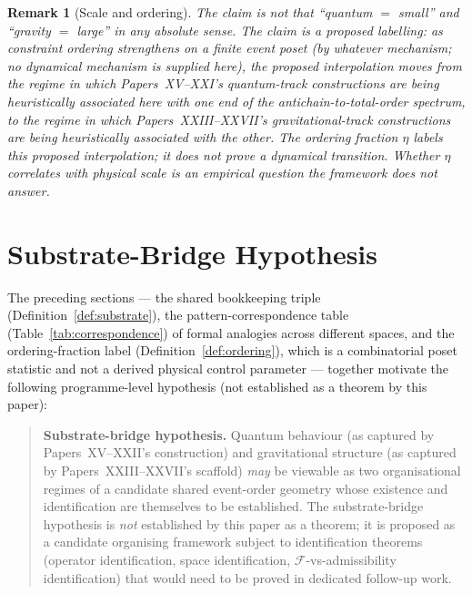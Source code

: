 \documentclass[12pt]{article}
\newtheorem{remark}[theorem]{Remark}
\newcommand{\Fcal}{\mathcal{F}}
\begin{document}
\begin{remark}[Scale and ordering]
The claim is not that ``quantum $=$ small'' and ``gravity $=$ large'' in any absolute sense. The claim is a proposed labelling: as constraint ordering strengthens on a finite event poset (by whatever mechanism; no dynamical mechanism is supplied here), the proposed interpolation moves from the regime in which Papers~XV--XXI's quantum-track constructions are being heuristically associated here with one end of the antichain-to-total-order spectrum, to the regime in which Papers~XXIII--XXVII's gravitational-track constructions are being heuristically associated with the other. The ordering fraction $\eta$ \emph{labels} this proposed interpolation; it does not prove a dynamical transition. Whether $\eta$ correlates with physical scale is an empirical question the framework does not answer.
\end{remark}

\section{Substrate-Bridge Hypothesis}\label{sec:unification}

The preceding sections --- the shared bookkeeping triple (Definition~\ref{def:substrate}), the pattern-correspondence table (Table~\ref{tab:correspondence}) of formal analogies across different spaces, and the ordering-fraction label (Definition~\ref{def:ordering}), which is a combinatorial poset statistic and not a derived physical control parameter --- together motivate the following programme-level hypothesis (not established as a theorem by this paper):

\begin{quote}
\textbf{Substrate-bridge hypothesis.} Quantum behaviour (as captured by Papers~XV--XXII's construction) and gravitational structure (as captured by Papers~XXIII--XXVII's scaffold) \emph{may} be viewable as two organisational regimes of a candidate shared event-order geometry whose existence and identification are themselves to be established. The substrate-bridge hypothesis is \emph{not} established by this paper as a theorem; it is proposed as a candidate organising framework subject to identification theorems (operator identification, space identification, $\Fcal$-vs-admissibility identification) that would need to be proved in dedicated follow-up work.
\end{quote}
\end{document}

